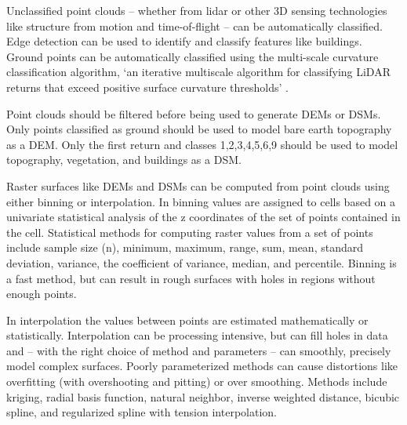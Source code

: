 \documentclass{article}
\begin{document}
Unclassified point clouds -- whether from lidar or other 3D sensing technologies like
structure from motion and time-of-flight -- can be automatically classified. 
%
Edge detection can be used to identify and classify features like buildings. 
%
Ground points can be automatically classified using the 
multi-scale curvature classification algorithm, 
`an iterative multiscale algorithm for classifying LiDAR returns
that exceed positive surface curvature thresholds'
\citep{Evans2007}. 

Point clouds should be filtered before being used to generate DEMs or DSMs. 
%
Only points classified as ground should be used to model bare earth topography as a DEM. 
%
Only the first return and classes 1,2,3,4,5,6,9 should be used to 
model topography, vegetation, and buildings as a DSM. 

Raster surfaces like DEMs and DSMs can be computed from point clouds 
using either binning or interpolation.
%
In binning values are assigned to cells based on 
a univariate statistical analysis of the z coordinates of the set of points 
contained in the cell. 
Statistical methods for computing raster values from a set of points include 
sample size (n), minimum, maximum, range, sum, mean, standard deviation, variance, the coefficient of variance, median, and percentile. 
Binning is a fast method, but can result in rough surfaces with holes in regions without enough points. 

In interpolation the values between points are estimated mathematically or statistically. 
%
Interpolation can be processing intensive, 
but can fill holes in data and 
-- with the right choice of method and parameters  -- 
can smoothly, precisely model complex surfaces.
%
Poorly parameterized methods can cause distortions like  
overfitting (with overshooting and pitting) or over smoothing. 
%
Methods include 
kriging, 
radial basis function,
natural neighbor,
inverse weighted distance,
bicubic spline,  
and regularized spline with tension
interpolation.
%




 
\end{document}
